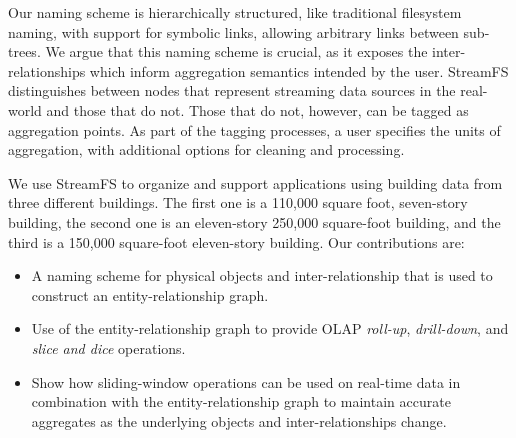 



Our naming scheme is hierarchically structured, like traditional filesystem naming, with support
for symbolic links, allowing arbitrary links between sub-trees.  We argue that this naming scheme
is crucial, as it exposes the inter-relationships which inform aggregation semantics intended
by the user.  StreamFS distinguishes between nodes that represent streaming data sources in the real-world
and those that do not.  Those that do not, however, can be tagged as aggregation points.  As part of the 
tagging processes, a user specifies the units of aggregation, with additional options for cleaning
and processing.

We use StreamFS to organize and support applications using building data from three different
buildings.  The first one is a 110,000 square foot, seven-story building, the second one is an eleven-story
250,000 square-foot building, and the third is a 150,000 square-foot eleven-story building.
Our contributions are:

\begin{itemize}
\item A naming scheme for physical objects and inter-relationship that is used to construct
		an entity-relationship graph.
\item Use of the entity-relationship graph to provide OLAP \emph{roll-up}, \emph{drill-down},
		and \emph{slice and dice} operations.
\item Show how sliding-window operations can be used on real-time data in combination with the entity-relationship
		graph to maintain accurate aggregates as the underlying objects and inter-relationships change.
\end{itemize}

